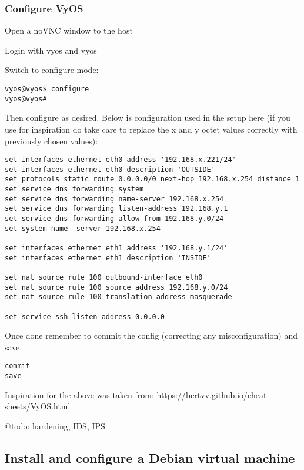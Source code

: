 \hypertarget{configure-vyos}{%
\subsubsection{Configure VyOS}\label{configure-vyos}}

Open a noVNC window to the host

Login with vyos and vyos

Switch to configure mode:

\begin{verbatim}
vyos@vyos$ configure
vyos@vyos#
\end{verbatim}

Then configure as desired. Below is configuration used in the setup here
(if you use for inspiration do take care to replace the x and y octet
values correctly with previously chosen values):

\begin{verbatim}
set interfaces ethernet eth0 address '192.168.x.221/24'
set interfaces ethernet eth0 description 'OUTSIDE'
set protocols static route 0.0.0.0/0 next-hop 192.168.x.254 distance 1
set service dns forwarding system
set service dns forwarding name-server 192.168.x.254
set service dns forwarding listen-address 192.168.y.1
set service dns forwarding allow-from 192.168.y.0/24
set system name -server 192.168.x.254

set interfaces ethernet eth1 address '192.168.y.1/24'
set interfaces ethernet eth1 description 'INSIDE'

set nat source rule 100 outbound-interface eth0
set nat source rule 100 source address 192.168.y.0/24
set nat source rule 100 translation address masquerade

set service ssh listen-address 0.0.0.0
\end{verbatim}

Once done remember to commit the config (correcting any
misconfiguration) and save.

\begin{verbatim}
commit
save
\end{verbatim}

Inspiration for the above was taken from:
https://bertvv.github.io/cheat-sheets/VyOS.html

@todo: hardening, IDS, IPS

\hypertarget{install-and-configure-a-debian-virtual-machine}{%
\subsection{Install and configure a Debian virtual
machine}\label{install-and-configure-a-debian-virtual-machine}}

